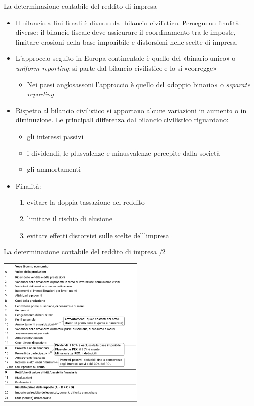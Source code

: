 \documentclass[aspectratio=149,11pt,italian]{beamer}
\begin{document}
\begin{frame}{La determinazione contabile del reddito di impresa}
\begin{itemize}
\item Il bilancio a fini fiscali è diverso dal bilancio civilistico.
Perseguono finalità diverse: il bilancio fiscale deve assicurare il
coordinamento tra le imposte, limitare erosioni della base imponibile e
distorsioni nelle scelte di impresa.
\item L'approccio seguito in Europa continentale è quello del «binario unico» o
\emph{uniform reporting}: si parte dal bilancio civilistico e lo si «corregge»
\begin{itemize}
\item Nei paesi anglosassoni l'approccio è quello del «doppio binario» o
\emph{separate reporting}
\end{itemize}
\item Rispetto al bilancio civilistico si apportano alcune variazioni in aumento o
in diminuzione. Le principali differenza dal bilancio civilistico
riguardano:
\begin{itemize}
\item gli interessi passivi
\item i dividendi, le plusvalenze e minusvalenze percepite dalla società
\item gli ammortamenti
\end{itemize}
\item Finalità:
\begin{enumerate}
\item evitare la doppia tassazione del reddito
\item limitare il rischio di elusione
\item evitare effetti distorsivi sulle scelte dell'impresa
\end{enumerate}
\end{itemize}
\end{frame}


\begin{frame}{La determinazione contabile del reddito di impresa /2}
\begin{center}
\centering
\includegraphics[height=7.5cm]{./figure/tabella-conto-economico.pdf}
\end{center}
\end{frame}
\end{document}
